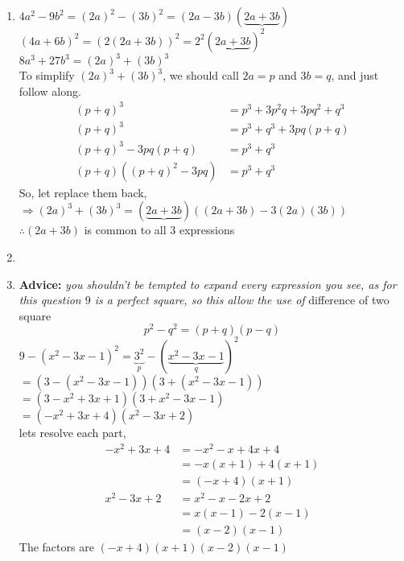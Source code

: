 \begin{multicols}{2}
\begin{enumerate}[label={\textbf{\arabic*.}}]
    \item 
        $4a^2 - 9b^2 = (2a)^2 - (3b)^2  = (2a - 3b)(\underbrace{2a+3b})$ \\
        $(4a + 6b)^2  = \left(2(2a + 3b)\right)^2 = 2^2 (\underbrace{2a + 3b})^2$ \\
        $8a^3 + 27b^3  = (2a)^3 + (3b)^3$ \\
        To simplify $(2a)^3 + (3b)^3$, we should call $2a = p $
        and $3b = q$, and just follow along. 
        \begin{align*} 
            (p + q)^3 &= p^3 + 3p^2q + 3pq^2 + q^3 \\
            (p + q)^3 &= p^3 + q^3 + 3pq(p + q)  \\
            (p + q)^3 - 3pq(p + q) & = p^3 + q^3 \\
            (p+q)((p+q)^2 - 3pq) &= p^3 + q^3
        \end {align*}
        So, let replace them back, \\
        $ \Rightarrow (2a)^3 + (3b)^3 =(\underbrace{2a + 3b})\left((2a + 3b) - 3(2a)(3b)\right) $ \\
        $\therefore (2a + 3b)$ is common to all 3 expressions
    \item
    \item \textbf{Advice:} \textit{you shouldn't be tempted to expand every expression you see, as for this question $9$ is a perfect square, so this allow the use of }difference of two square \\
    $$\boxed{p^2 - q^2 = (p+q)(p-q)}$$ 
        $9 - (x^2 - 3x - 1)^2 = \underbrace{3^2}_{p} - (\underbrace{x^2 - 3x -1}_{q})^2$  \\
        $= (3 - (x^2 - 3x  - 1) )(3 + (x^2 - 3x  - 1) )$ \\
        $= (3 - x^2 + 3x  + 1 )(3 + x^2 - 3x  - 1 )$ \\
        $= (- x^2 + 3x  + 4 )(x^2 - 3x  + 2 )$ \\
    lets resolve each part, \vspace{-10pt}
    \begin{align*}
    -x^2 + 3x + 4 &= -x^2 -x + 4x + 4 \\
    & = -x(x + 1) + 4(x + 1) \\
    & = (-x + 4)(x+1)\\
    x^2 - 3x + 2 &= x^2 - x -2x + 2 \\
    & = x(x-1) -2 (x -1) \\
    & = (x-2)(x-1)
    \end{align*} 
    The factors are  $(-x + 4)(x+1)(x-2)(x-1)$


\end{enumerate}
\end{multicols}

